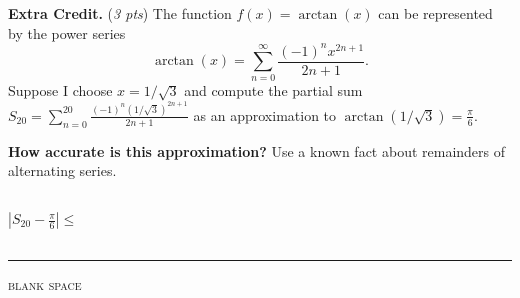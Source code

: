 \documentclass[11pt]{amsart}
\newcommand{\ds}{\displaystyle}
\newcommand{\prob}[1]{\bigskip\noindent\textbf{#1.} }
\newcommand{\pts}[1]{(\emph{#1 pts})}
\newcommand{\probpts}[2]{\prob{#1} \pts{#2} \quad}
\begin{document}
\clearpage\newpage
\probpts{Extra Credit}{3}  The function $f(x)=\arctan(x)$ can be represented by the power series
    $$\arctan(x) = \sum_{n=0}^\infty \frac{(-1)^n x^{2n+1}}{2n+1}.$$
Suppose I choose $x=1/\sqrt{3}$ and compute the partial sum $\ds S_{20} = \sum_{n=0}^{20} \frac{(-1)^n (1/\sqrt{3})^{2n+1}}{2n+1}$ as an approximation to $\ds \arctan(1/\sqrt{3}) = \frac{\pi}{6}$.

\medskip
\textbf{How accurate is this approximation?}  Use a known fact about remainders of alternating series.
\vspace{2.0in}

$\ds \left|S_{20} - \frac{\pi}{6}\right| \le \boxed{\phantom{\begin{matrix} lakjsd alsfjd \\ sdfa  asdf as ads fasdd \\ sdaf \end{matrix}}}$

\bigskip
\noindent \hrule
\begin{center}
\small
\bigskip
\textsc{blank space}
\end{center}
\vfill
\end{document}
